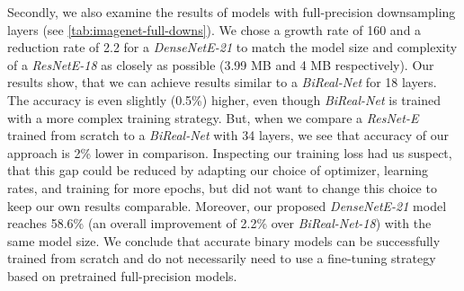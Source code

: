\documentclass[10pt,twocolumn,letterpaper]{article}
\newcommand{\arch}[1]{\emph{#1}}
\begin{document}
Secondly, we also examine the results of models with full-precision downsampling layers (see \autoref{tab:imagenet-full-downs}).
We chose a growth rate of 160 and a reduction rate of 2.2 for a \arch{DenseNetE-21} to match the model size and complexity of a \arch{ResNetE-18} as closely as possible (3.99 MB and 4 MB respectively).
Our results show, that we can achieve results similar to a \arch{BiReal-Net}\cite{Liu_2018_ECCV} for 18 layers.
The accuracy is even slightly (0.5\%) higher, even though \arch{BiReal-Net} is trained with a more complex training strategy.
But, when we compare a \arch{ResNet-E} trained from scratch to a \arch{BiReal-Net} with 34 layers, we see that accuracy of our approach is 2\% lower in comparison.
Inspecting our training loss had us suspect, that this gap could be reduced by adapting our choice of optimizer, learning rates, and training for more epochs, but did not want to change this choice to keep our own results comparable.
Moreover, our proposed \arch{DenseNetE-21} model reaches 58.6\% (an overall improvement of 2.2\% over \arch{BiReal-Net-18}) with the same model size.
We conclude that accurate binary models can be successfully trained from scratch and do not necessarily need to use a fine-tuning strategy based on pretrained full-precision models.
\end{document}
